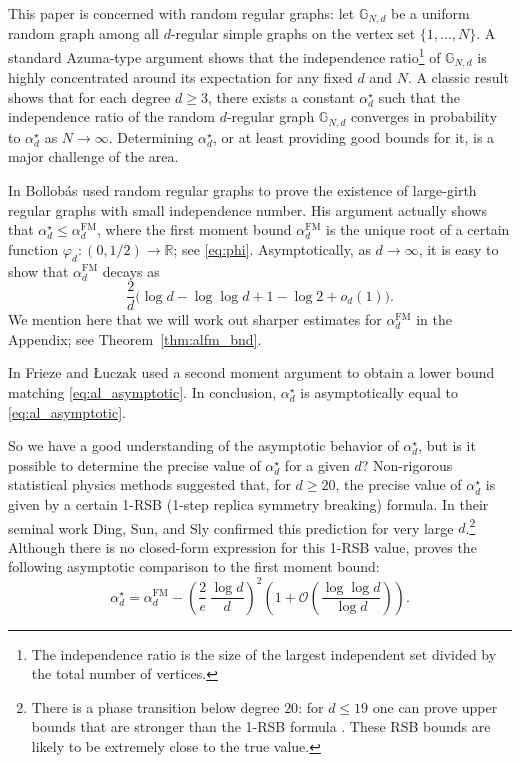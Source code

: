 \documentclass[12pt]{amsart}
\theoremstyle{definition}
\newcommand\Rb{\mathbb{R}}
\newcommand\Gb{\mathbb{G}}
\newcommand\Oc{\mathcal{O}}  %
\newcommand\alstar{\alpha^{\star}}
\newcommand\alfm{\alpha^{\mathrm{FM}}}
\begin{document}
This paper is concerned with random regular graphs: let $\Gb_{N,d}$ be a uniform random graph among all $d$-regular simple graphs on the vertex set $\{1,\ldots,N\}$. A standard Azuma-type argument shows that the independence ratio\footnote{The independence ratio is the size of the largest independent set divided by the total number of vertices.} of $\Gb_{N,d}$ is highly concentrated around its expectation for any fixed $d$ and $N$. A classic result \cite{bayati2013interpolation} shows that for each degree $d \geq 3$, there exists a constant $\alstar_d$ such that the independence ratio of the random $d$-regular graph $\Gb_{N,d}$ converges in probability to $\alstar_d$ as $N \to \infty$. Determining $\alstar_d$, or at least providing good bounds for it, is a major challenge of the area. 

In \cite{bollobas1981independence} Bollob\'as used random regular graphs to prove the existence of large-girth regular graphs with small independence number. His argument actually shows that $\alstar_d \leq \alfm_d$, where the first moment bound $\alfm_d$ is the unique root of a certain function $\varphi_d \colon (0,1/2) \to \Rb$; see \eqref{eq:phi}. Asymptotically, as $d \to \infty$, it is easy to show that $\alfm_d$ decays as 
%
\begin{equation} \label{eq:al_asymptotic}
\frac{2}{d} \bigg( 
\log d - \log \log d + 1 - \log 2 + o_d(1) \bigg) .
\end{equation}
%
We mention here that we will work out sharper estimates for $\alfm_d$ in the Appendix; see Theorem~\ref{thm:alfm_bnd}. 

In \cite{frieze1990independence,frieze1992independence} Frieze and {\L}uczak used a second moment argument to obtain a lower bound matching \eqref{eq:al_asymptotic}. In conclusion, $\alstar_d$ is asymptotically equal to \eqref{eq:al_asymptotic}. 

So we have a good understanding of the asymptotic behavior of $\alstar_d$, but is it possible to determine the precise value of $\alstar_d$ for a given $d$? Non-rigorous statistical physics methods \cite{barbier2013hardcore} suggested that, for $d \geq 20$, the precise value of $\alstar_d$ is given by a certain 1-RSB (1-step replica symmetry breaking) formula. In their seminal work \cite{ding2016maximum} Ding, Sun, and Sly confirmed this prediction for very large $d$.\footnote{There is a phase transition below degree $20$: for $d \leq 19$ one can prove upper bounds that are stronger than the 1-RSB formula \cite{harangi2023rsb}. These RSB bounds are likely to be extremely close to the true value.} Although there is no closed-form expression for this 1-RSB value, \cite[Theorem 3.1]{ding2016maximum} proves the following asymptotic comparison to the first moment bound:
%
\begin{equation} \label{eq:alstar_vs_alfm}
\alstar_d = \alfm_d - \left( \frac{2}{e} \, \frac{\log d}{d} \right)^2
\left( 1 + \Oc \left( \frac{\log \log d}{\log d} \right) \right) .
\end{equation}
%
\end{document}
